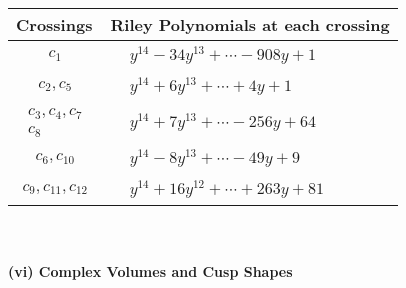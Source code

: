 \documentclass[1p]{elsarticle_modified}
\theoremstyle{definition}
\begin{document}
\begin{tabular}{m{50pt}|m{274pt}}
Crossings & \hspace{64pt}Riley Polynomials at each crossing \\
\hline $$\begin{aligned}c_{1}\end{aligned}$$&$\begin{aligned}
&y^{14}-34 y^{13}+\cdots-908 y+1
\end{aligned}$\\
\hline $$\begin{aligned}c_{2},c_{5}\end{aligned}$$&$\begin{aligned}
&y^{14}+6 y^{13}+\cdots+4 y+1
\end{aligned}$\\
\hline $$\begin{aligned}c_{3},c_{4},c_{7}\\c_{8}\end{aligned}$$&$\begin{aligned}
&y^{14}+7 y^{13}+\cdots-256 y+64
\end{aligned}$\\
\hline $$\begin{aligned}c_{6},c_{10}\end{aligned}$$&$\begin{aligned}
&y^{14}-8 y^{13}+\cdots-49 y+9
\end{aligned}$\\
\hline $$\begin{aligned}c_{9},c_{11},c_{12}\end{aligned}$$&$\begin{aligned}
&y^{14}+16 y^{12}+\cdots+263 y+81
\end{aligned}$\\
\hline
\end{tabular}\\~\\
\newpage\flushleft \textbf{(vi) Complex Volumes and Cusp Shapes}
\end{document}
